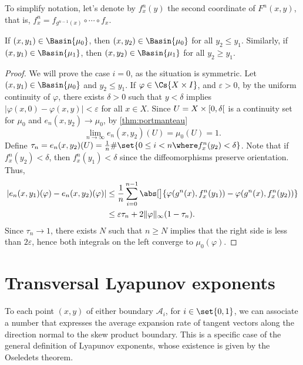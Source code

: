 \documentclass[../main]{subfiles}
\begin{document}
To simplify notation, let's denote by \(f_x^{n}(y)\) the second coordinate of \(F^n(x,y)\), that is, \(f_x^{n} = f_{g^{n - 1}(x)} \circ \cdots \circ f_x\).

\begin{lemma}\label{lem:basin-segment}
  If \((x, y_1) \in \Basin{\mu_0}\), then \((x,y_2) \in \Basin{\mu_0}\) for all \(y_2 \leq y_1\). Similarly, if \((x, y_1) \in \Basin{\mu_1}\), then \((x,y_2) \in \Basin{\mu_1}\) for all \(y_2 \geq y_1\).
\end{lemma}

\begin{proof}
  We will prove the case \(i = 0\), as the situation is symmetric. Let \((x,y_1) \in \Basin{\mu_0}\) and \(y_2 \leq y_1\). If \(\varphi \in \Cs{X \times I}\), and \(\varepsilon > 0\), by the uniform continuity of \(\varphi\), there exists \(\delta > 0\) such that \(y < \delta\) implies \(\lvert \varphi(x,0) - \varphi(x,y) \rvert < \varepsilon\) for all \(x \in X\). Since \(U = X \times \interval[open right]{0}{\delta}\) is a continuity set for \(\mu_0\) and \(e_n(x,y_2) \to \mu_0\), by \cref{thm:portmanteau}
    \newcommand{\timeinU}{\frac{1}{n}\# \set{ 0 \leq i < n \where f_x^n(y_2) < \delta }}
    \[\lim_{n \to \infty} e_n(x,y_2)(U) = \mu_0(U) = 1.\]
    Define \(\tau_n = e_n(x,y_2)(U) = \timeinU\).
    Note that if \(f_x^n(y_2) < \delta\), then \(f_x^n(y_1) < \delta\) since the diffeomorphisms preserve orientation. Thus,
    \begin{align*}
      \lvert e_n(x,y_1)(\varphi) - e_n(x,y_2)(\varphi) \rvert
      &\leq \frac{1}{n}\sum_{i = 0}^{n - 1}\abs[\big]{\varphi(g^n(x),f_x^{n}(y_1)) - \varphi(g^n(x),f_x^{n}(y_2))}\\
      &\leq \varepsilon \tau_n + 2 \lVert \varphi \rVert_{\infty} (1 - \tau_n).
    \end{align*}
    Since \(\tau_n \to 1\), there exists \(N\) such that \(n \geq N\) implies that the right side is less than \(2 \varepsilon\), hence both integrals on the left converge to \(\mu_0(\varphi)\).
\end{proof}

\section{Transversal Lyapunov exponents}

To each point \((x,y)\) of either boundary \(\mathcal{A}_i\), for \(i \in \set{0,1}\), we can associate a number that expresses the average expansion rate of tangent vectors along the direction normal to the skew product boundary. This is a specific case of the general definition of Lyapunov exponents, whose existence is given by the Oseledets theorem.
\end{document}

